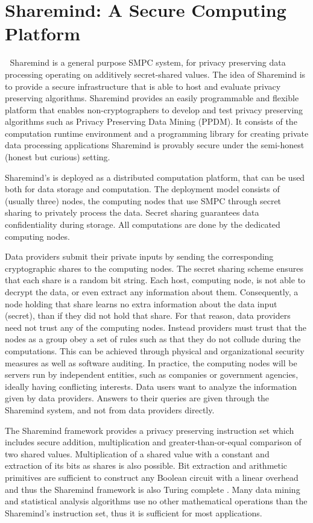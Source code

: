 \chapter{Sharemind: A Secure Computing Platform}\label{c:sharemind}

Sharemind \cite{bogdanov2008sharemind, bogdanov2013sharemind} is a general purpose SMPC system, for privacy preserving data processing operating on additively secret-shared values.
The idea of Sharemind is to provide a secure infrastructure that is able to host and evaluate privacy preserving algorithms.
Sharemind provides an easily programmable and flexible platform that enables non\hyp cryptographers to develop and test privacy preserving algorithms such as Privacy Preserving Data Mining (PPDM).
It consists of the computation runtime environment and a programming library for creating private data processing applications
Sharemind is provably secure under the semi-honest (honest but curious) setting.

Sharemind’s is deployed as a distributed computation platform, that can be used both for data storage and computation.
The deployment model consists of (usually three) nodes, the computing nodes that use SMPC through secret sharing to privately process the data.
Secret sharing guarantees data confidentiality during storage.
All computations are done by the dedicated computing nodes.

Data providers submit their private inputs by sending the corresponding cryptographic shares to the computing nodes.
The secret sharing scheme ensures that each share is a random bit string.
Each host, computing node, is not able to decrypt the data, or even extract any information about them.
Consequently, a node holding that share learns no extra information about the data input (secret), than if they did not hold that share.
For that reason, data providers need not trust any of the computing nodes.
Instead providers must trust that the nodes as a group obey a set of rules such as that they do not collude during the computations.
This can be achieved through physical and organizational security measures as well as software auditing.
In practice, the computing nodes will be servers run by independent entities, such as companies or government agencies, ideally having conflicting interests.
Data users want to analyze the information given by data providers.
Answers to their queries are given through the Sharemind system, and not from data providers directly.


The Sharemind framework provides a privacy preserving  instruction set which includes secure addition, multiplication and greater\hyp than\hyp or\hyp equal comparison of two shared values.
Multiplication of a shared value with a constant and extraction of its bits as shares is also possible.
Bit extraction and arithmetic primitives are sufficient to construct any Boolean circuit with a linear overhead and thus the Sharemind framework is also Turing complete \cite{bogdanov2008sharemind}.
Many data mining and statistical analysis algorithms use no other mathematical operations than the Sharemind's instruction set, thus it is sufficient for most applications.

